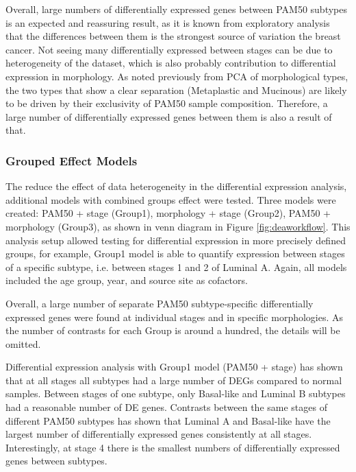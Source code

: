         Overall, large numbers of differentially expressed genes between PAM50 subtypes is an expected and reassuring result, as it is known from exploratory analysis that the differences between them is the strongest source of variation the breast cancer. Not seeing many differentially expressed between stages can be due to heterogeneity of the dataset, which is also probably contribution to differential expression in morphology. As noted previously from PCA of morphological types, the two types that show a clear separation (Metaplastic and Mucinous) are likely to be driven by their exclusivity of PAM50 sample composition. Therefore, a large number of differentially expressed genes between them is also a result of that. 

        \subsubsection{Grouped Effect Models}
        
        The reduce the effect of data heterogeneity in the differential expression analysis, additional models with combined groups effect were tested. Three models were created: PAM50 + stage (Group1), morphology + stage (Group2), PAM50 + morphology (Group3), as shown in venn diagram in Figure \ref{fig:deaworkflow}. This analysis setup allowed testing for differential expression in more precisely defined groups,  for example, Group1 model is able to quantify expression between stages of a specific subtype, i.e. between stages 1 and 2 of Luminal A. Again, all models included the age group, year, and source site as cofactors.

        Overall,  a large number of separate PAM50 subtype-specific differentially expressed genes were found at individual stages and in specific morphologies. As the number of contrasts for each Group is around a hundred, the details will be omitted. 
        
        Differential expression analysis with Group1 model (PAM50 + stage) has shown that at all stages all subtypes had a large number of DEGs compared to normal samples. Between stages of one subtype, only Basal-like and Luminal B subtypes had a reasonable number of DE genes. Contrasts between the same stages of different PAM50 subtypes has shown that Luminal A and Basal-like have the largest number of differentially expressed genes consistently at all stages. Interestingly, at stage 4 there is the smallest numbers of differentially expressed genes between subtypes. 
        
